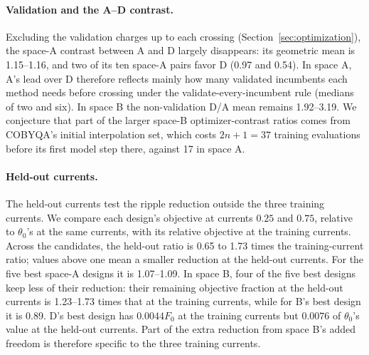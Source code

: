 \documentclass{anvil-paper}
\begin{document}
\paragraph{Validation and the A--D contrast.}
Excluding the validation charges up to each crossing
(Section~\ref{sec:optimization}), the space-A contrast between A and D
largely disappears: its geometric mean is 1.15--1.16, and two of its ten space-A pairs favor D
(0.97 and 0.54). In space A, A's lead over D therefore reflects mainly how
many validated incumbents each method needs before crossing under the
validate-every-incumbent rule (medians of two and six). In space B the
non-validation D/A mean remains 1.92--3.19. We conjecture that part of the larger
space-B optimizer-contrast ratios comes from COBYQA's initial interpolation set, which costs
$2n+1=37$ training evaluations before its first model step there, against
17 in space A.

\paragraph{Held-out currents.}
The held-out currents test the ripple reduction outside the three training
currents. We compare each design's objective at currents $0.25$ and $0.75$,
relative to $\theta_0$'s at the same currents, with its relative objective
at the training currents. Across the candidates, the held-out ratio is 0.65
to 1.73 times the training-current ratio; values above one mean a smaller
reduction at the held-out currents. For the five best space-A designs it
is 1.07--1.09. In space B, four of the five best designs keep less of
their reduction: their remaining objective fraction at the held-out currents
is 1.23--1.73 times that at the training currents, while for B's best
design it is 0.89. D's best design has $0.0044F_0$ at the training currents but
$0.0076$ of $\theta_0$'s value at the held-out currents. Part of the extra
reduction from space B's added freedom is therefore specific to the three
training currents.

\begin{table}[tbp]\centering\small
\caption{Validation charges, repeat~1. ``To crossing'' counts the
validations up to and including the first attaining one, and ``share''
gives the fraction of the time to that target charged to validation, as
medians (ranges) over the method's attained targets and starts. ``Run''
gives the range over starts of the fraction of the whole run's charged time
spent in validation.}
\label{tab:exp2-validation}
\end{table}
\end{document}
